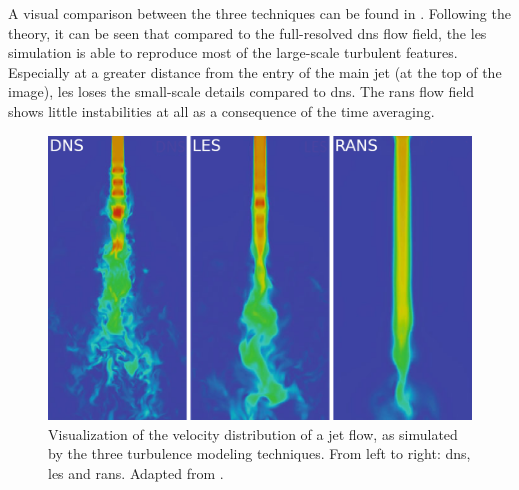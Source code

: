 A visual comparison between the three techniques can be found in . Following the theory, it can be seen that compared to the full-resolved \acrshort{dns} flow field, the \acrshort{les} simulation is able to reproduce most of the large-scale turbulent features. Especially at a greater distance from the entry of the main jet (at the top of the image), \acrshort{les} loses the small-scale details compared to \acrshort{dns}. The \acrshort{rans} flow field shows little instabilities at all as a consequence of the time averaging. 

\begin{figure}
    \centering
    \includegraphics[width=\textwidth]{../images/drawings/turbulence_model_comparison.png}
    \caption{Visualization of the velocity distribution of a jet flow, as simulated by the three turbulence modeling techniques. From left to right: \acrfull{dns}, \acrfull{les} and \acrfull{rans}. Adapted from \citet{Rodriguez2019}.}
    \label{fig:turbulence_model_comparison}
\end{figure}
